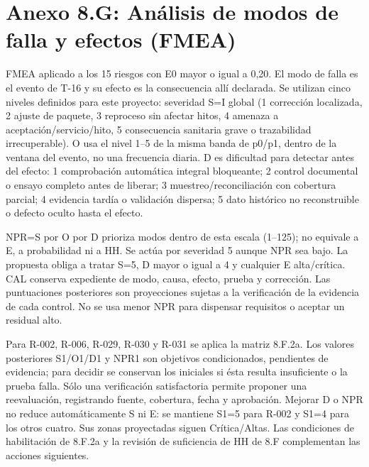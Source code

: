 \clearpage
\section{Anexo 8.G: Análisis de modos de falla y efectos (FMEA)}
FMEA aplicado a los 15 riesgos con E0 mayor o igual a 0,20. El modo de falla es el evento de T-16 y su efecto es la consecuencia allí declarada. Se utilizan cinco niveles definidos para este proyecto: severidad S=I global (1 corrección localizada, 2 ajuste de paquete, 3 reproceso sin afectar hitos, 4 amenaza a aceptación/servicio/hito, 5 consecuencia sanitaria grave o trazabilidad irrecuperable). O usa el nivel 1--5 de la misma banda de p0/p1, dentro de la ventana del evento, no una frecuencia diaria. D es dificultad para detectar antes del efecto: 1 comprobación automática integral bloqueante; 2 control documental o ensayo completo antes de liberar; 3 muestreo/reconciliación con cobertura parcial; 4 evidencia tardía o validación dispersa; 5 dato histórico no reconstruible o defecto oculto hasta el efecto.

NPR=S por O por D prioriza modos dentro de esta escala (1--125); no equivale a E, a probabilidad ni a HH. Se actúa por severidad 5 aunque NPR sea bajo. La propuesta obliga a tratar S=5, D mayor o igual a 4 y cualquier E alta/crítica. CAL conserva expediente de modo, causa, efecto, prueba y corrección. Las puntuaciones posteriores son proyecciones sujetas a la verificación de la evidencia de cada control. No se usa menor NPR para dispensar requisitos o aceptar un residual alto.

Para R-002, R-006, R-029, R-030 y R-031 se aplica la matriz 8.F.2a. Los valores
posteriores S1/O1/D1 y NPR1 son objetivos condicionados, pendientes de evidencia;
para decidir se conservan los iniciales si ésta resulta insuficiente o la prueba
falla. Sólo una verificación satisfactoria permite proponer una reevaluación,
registrando fuente, cobertura, fecha y aprobación. Mejorar D o NPR no reduce
automáticamente S ni E: se mantiene S1=5 para R-002 y S1=4 para los otros cuatro.
Sus zonas proyectadas siguen Crítica/Altas. Las condiciones de habilitación de
8.F.2a y la revisión de suficiencia de HH de 8.F complementan las acciones siguientes.

